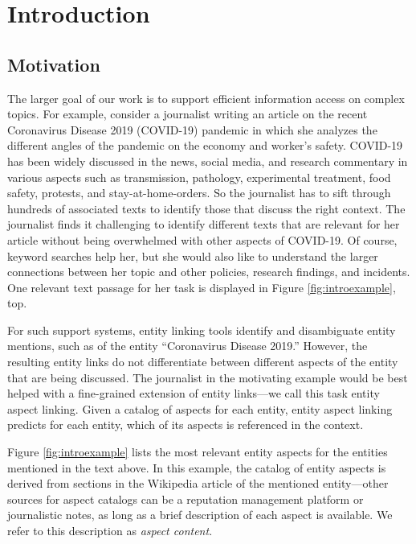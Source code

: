 \section{Introduction}
\label{sec:Introduction}

\subsection{Motivation}

The larger goal of our work is to support efficient information access on complex topics. 
%
For example, consider a journalist writing an article on the recent Coronavirus Disease 2019 (COVID-19)
pandemic in which she analyzes the different angles of the pandemic on the economy and worker's safety. COVID-19 has been widely discussed in the news, social media, and research commentary in various aspects such as transmission, pathology, experimental treatment, food safety, protests, and stay-at-home-orders. So the journalist has to sift through hundreds of associated texts to identify those that discuss the right context. The journalist finds it challenging to identify different texts that are relevant for her article without being overwhelmed with other aspects of COVID-19. Of course, keyword searches help her, but she would also like to understand the larger connections between her topic and other policies, research findings, and incidents. One relevant text passage for her task is displayed in Figure \ref{fig:introexample}, top. 





For such support systems, entity linking tools \cite{ferragina2010tagme,mendes2011dbpedia,piccinno2014wat} identify and disambiguate entity mentions, such as of the entity ``Coronavirus Disease 2019.'' However, the resulting entity links do not differentiate between different aspects of the entity that are being discussed. The journalist in the motivating example would be best helped with a fine-grained extension of entity links---we call this task entity aspect linking. Given a catalog of aspects for each entity, entity aspect linking predicts for each entity, which of its aspects is referenced in the context. 

 Figure \ref{fig:introexample} lists the most relevant entity aspects for the entities mentioned in the text above.  In this example, the catalog of entity aspects is derived from sections in the Wikipedia article of the mentioned entity---other sources for aspect catalogs can be a reputation management platform or journalistic notes, as long as a brief description of each aspect is available. We refer to this description as \emph{aspect content}.  
 
